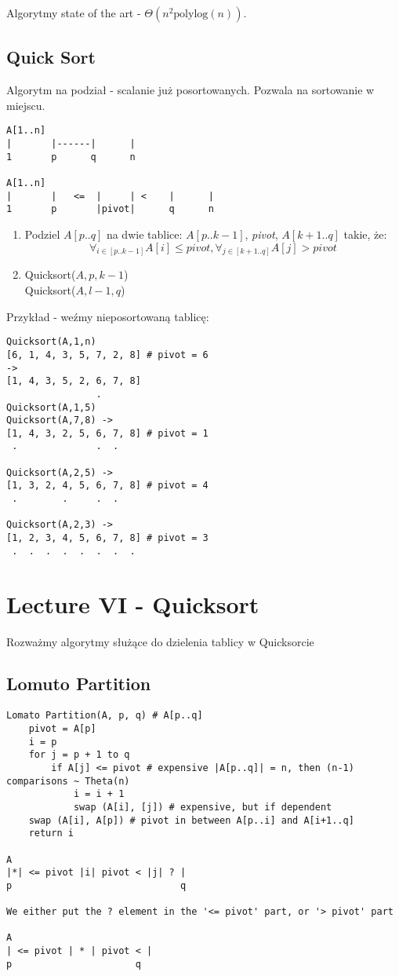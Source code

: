 \documentclass{article}
\begin{document}
Algorytmy state of the art - $\Theta(n^2 \text{polylog}(n))$.

\subsection{Quick Sort}

Algorytm na podział - scalanie już posortowanych. Pozwala na sortowanie w miejscu.

\begin{verbatim}
A[1..n]
|       |------|      |
1       p      q      n

A[1..n]
|       |   <=  |     | <    |      | 
1       p       |pivot|      q      n
\end{verbatim}

\begin{enumerate}
    \item Podziel $A[p..q]$ na dwie tablice:
    $A[p..k-1]$, \textit{pivot}, $A[k+1..q]$
    takie, że:
    \[
    \forall_{i\in[p..k-1]} A[i] \leq \textit{pivot}, \forall_{j\in[k+1..q]} A[j] > \textit{pivot}
    \]
    \item Quicksort($A,p,k-1$)\\
    Quicksort($A,l-1,q$)
\end{enumerate}
Przykład - weźmy nieposortowaną tablicę:
\begin{verbatim}
Quicksort(A,1,n)
[6, 1, 4, 3, 5, 7, 2, 8] # pivot = 6
->
[1, 4, 3, 5, 2, 6, 7, 8]
                .
Quicksort(A,1,5)
Quicksort(A,7,8) ->
[1, 4, 3, 2, 5, 6, 7, 8] # pivot = 1
 .              .  .

Quicksort(A,2,5) ->
[1, 3, 2, 4, 5, 6, 7, 8] # pivot = 4
 .        .     .  .

Quicksort(A,2,3) ->
[1, 2, 3, 4, 5, 6, 7, 8] # pivot = 3
 .  .  .  .  .  .  .  .
\end{verbatim}
   
\section{Lecture VI - Quicksort}

Rozważmy algorytmy służące do dzielenia tablicy w Quicksorcie

\subsection{Lomuto Partition}

\begin{verbatim}
Lomato Partition(A, p, q) # A[p..q]
    pivot = A[p]
    i = p
    for j = p + 1 to q
        if A[j] <= pivot # expensive |A[p..q]| = n, then (n-1) comparisons ~ Theta(n)
            i = i + 1
            swap (A[i], [j]) # expensive, but if dependent
    swap (A[i], A[p]) # pivot in between A[p..i] and A[i+1..q]
    return i

A
|*| <= pivot |i| pivot < |j| ? |
p                              q

We either put the ? element in the '<= pivot' part, or '> pivot' part

A
| <= pivot | * | pivot < |
p                      q
\end{verbatim}
\end{document}
